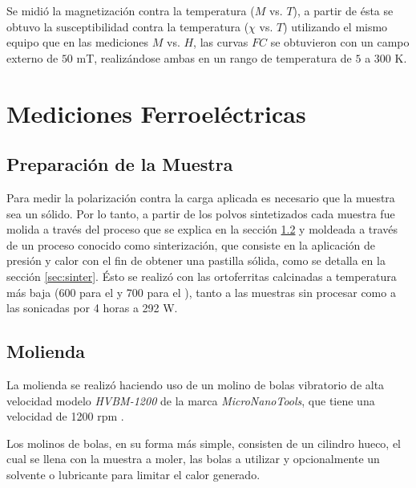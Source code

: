 \documentclass[../main.tex]{subfiles}
\begin{document}
Se midió la magnetización contra la temperatura ($M$ vs. $T$), a partir de ésta se obtuvo la susceptibilidad contra la temperatura ($\chi$ vs. $T$) utilizando el mismo equipo que en las mediciones $M$ vs. $H$, las curvas $FC$ se obtuvieron con un campo externo de $50$ mT, realizándose ambas en un rango de temperatura de $5$ a $300$ K.
\section{Mediciones Ferroeléctricas}\label{sec:metodologiapolar}

\subsection{Preparación de la Muestra}
Para medir la polarización contra la carga aplicada es necesario que la muestra sea un sólido. Por lo tanto, a partir de los polvos sintetizados cada muestra fue molida a través del proceso que se explica en la sección \ref{sec:molienda} y moldeada a través de un proceso conocido como sinterización, que consiste en la aplicación de presión y calor con el fin de obtener una pastilla sólida, como se detalla en la sección \ref{sec:sinter}. Ésto se realizó con las ortoferritas calcinadas a temperatura más baja (600\gradoC{} para el \neod{} y 700\gradoC{} para el \sama{}), tanto a las muestras sin procesar como a las sonicadas por 4 horas a 292 W.

\subsection{Molienda} \label{sec:molienda}
La molienda se realizó haciendo uso de un molino de bolas vibratorio de alta velocidad modelo \textit{HVBM-1200} de la marca \textit{MicroNanoTools}, que tiene una velocidad de 1200 rpm \cite{Molino}.

Los molinos de bolas, en su forma más simple, consisten de un cilindro hueco, el cual se llena con la muestra a moler, las bolas a utilizar y opcionalmente un solvente o lubricante para limitar el calor generado.
\end{document}
